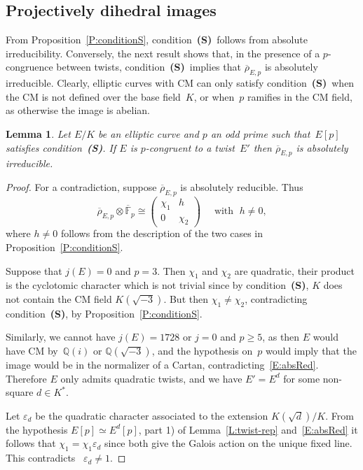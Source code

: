 \documentclass[12pt, reqno]{amsart}
\newcommand{\F}{\mathbb{F}}
\newcommand{\Fbar}{{\overline{\F}}}
\newcommand{\Q}{\mathbb{Q}}
\newcommand{\rhobar}{{\overline{\rho}}}
\newcommand{\eps}{\varepsilon}
\numberwithin{equation}{section}
\newtheorem{lemma}[theorem]{Lemma}
\theoremstyle{definition}
\theoremstyle{remark}
\newcommand{\condS}{condition~{\bf (S)}}
\begin{document}
\subsection{Projectively dihedral images}
From Proposition~\ref{P:conditionS}, \condS\ follows from
absolute irreducibility.  Conversely, the next result shows that, in
the presence of a $p$-congruence between twists, \condS\
implies that $\rhobar_{E,p}$ is absolutely irreducible.  Clearly,
elliptic curves with CM can only satisfy \condS\ when the
CM is not defined over the base field~$K$, or when~$p$ ramifies in the
CM field, as otherwise the image is abelian.

\begin{lemma} \label{L:noCyclic}
Let $E/K$ be an elliptic curve and $p$ an odd prime such that~$E[p]$
satisfies \condS.  If $E$ is $p$-congruent to a
twist~$E'$ then $\rhobar_{E,p}$ is absolutely irreducible.
\end{lemma}
\begin{proof}
For a contradiction, suppose $\rhobar_{E,p}$ is absolutely reducible. Thus
\begin{equation} \label{E:absRed}
  \rhobar_{E,p} \otimes \Fbar_p \cong 
 \begin{pmatrix}
 \chi_1 & h \\ 0 &\chi_2
 \end{pmatrix} \quad \text{ with } \; h \neq 0, 
\end{equation} 
where $h \neq 0$ follows from 
the description of the two cases
in Proposition~\ref{P:conditionS}.

Suppose that $j(E)=0$ and $p=3$.  Then $\chi_1$ and $\chi_2$ are
quadratic, their product is the cyclotomic character which is not
trivial since by \condS, $K$ does not contain the CM field
$K(\sqrt{-3})$.  But then $\chi_1\not=\chi_2$, contradicting
\condS, by Proposition~\ref{P:conditionS}.

Similarly, we cannot have $j(E) = 1728$ or $j=0$ and $p\ge5$, as then
$E$ would have CM by~$\Q(i)$ or $\Q(\sqrt{-3})$, and the hypothesis
on~$p$ would imply that the image would be in the normalizer of a
Cartan, contradicting~\eqref{E:absRed}. Therefore $E$ only admits
quadratic twists, and we have $E' = E^d$ for some non-square $d \in
K^*$.

Let $\eps_d$ be the quadratic character associated to the extension
$K(\sqrt{d})/K$. From the hypothesis $E[p] \simeq E^d[p]$, part 1) of
Lemma~\ref{L:twist-rep} and~\eqref{E:absRed} it follows that $\chi_1
=\chi_1\eps_d$ since both give the Galois action on the unique fixed
line. This contradicts ~$\eps_d \neq 1$.
\end{proof}
\end{document}
